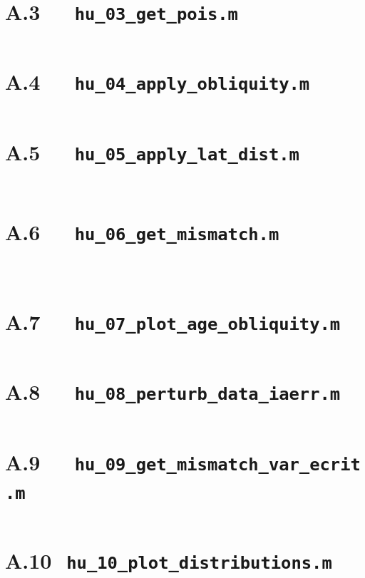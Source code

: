 \documentclass{ucetd}
\begin{document}
\section*{A.3\ \ \ \texttt{hu\_03\_get\_pois.m}}
\inputminted{matlab}{code/hu_03_get_pois.m}

\section*{A.4\ \ \ \texttt{hu\_04\_apply\_obliquity.m}}
\inputminted{matlab}{code/hu_04_apply_obliquity.m}

\section*{A.5\ \ \ \texttt{hu\_05\_apply\_lat\_dist.m}}
\inputminted{matlab}{code/hu_05_apply_lat_dist.m}
\inputminted{matlab}{code/hu_05a_find_lat_dist.m}

\section*{A.6\ \ \ \texttt{hu\_06\_get\_mismatch.m}}
\inputminted{matlab}{code/hu_06_get_mismatch.m}
\inputminted{matlab}{code/hu_06a_chi2test.m}
\inputminted{matlab}{code/hu_06b_gaussamp.m}

\section*{A.7\ \ \ \texttt{hu\_07\_plot\_age\_obliquity.m}}
\inputminted{matlab}{code/hu_07_plot_age_obliquity.m}

\section*{A.8\ \ \ \texttt{hu\_08\_perturb\_data\_iaerr.m}}
\inputminted{matlab}{code/hu_08_perturb_data_iaerr.m}

\section*{A.9\ \ \ \texttt{hu\_09\_get\_mismatch\_var\_ecrit.m}}
\inputminted{matlab}{code/hu_09_get_mismatch_var_ecrit.m}

\section*{A.10\ \,\texttt{hu\_10\_plot\_distributions.m}}
\inputminted{matlab}{code/hu_10_plot_distributions.m}
\end{document}
